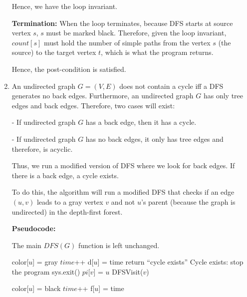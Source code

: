 \documentclass[a4paper]{report}
\begin{document}
\begin{enumerate}
    Hence, we have the loop invariant. 

    {\bf Termination:}
    When the loop terminates, because DFS starts at source vertex $s$, $s$ must be marked black. Therefore, 
    given the loop invariant, $count[s]$ must hold the number of simple paths from the vertex $s$ (the source) to
    the target vertex $t$, which is what the program returns.

    Hence, the post-condition is satisfied.

    \par
    \bigskip

    \item
      An undirected graph $G = (V,E)$ does not contain a cycle iff a DFS generates no back edges. Furthermore, an undirected
      graph $G$ has only tree edges and back edges. Therefore, two cases will exist:

        - If undirected graph $G$ has a back edge, then it has a cycle. 

        - If undirected graph $G$ has no back edges, it only has tree edges and therefore, is acyclic.

      Thus, we run a modified version of DFS where we look for back edges. If there is a back edge, a cycle exists.

      To do this, the algorithm will run a modified DFS that checks if an edge $(u,v)$ leads to a gray vertex $v$ and not 
      $u$'s parent (because the graph is undirected) in the depth-first forest. 

    {\bf Pseudocode:}

    The main $DFS(G)$ function is left unchanged.

    \begin{algorithmic}[1]
      \State color[$u$] = gray
      \State $time$++
      \State d[$u$] = time
          \State return ``cycle exists''
          \Comment Cycle exists: stop the program
          \State sys.exit()
        \EndIf
          \State $pi$[$v$] = $u$
          \State DFSVisit($v$)
        \EndIf
      \EndFor

      \State color[$u$] = black
      \State $time$++
      \State f[$u$] = time
    \EndFunction
    \end{algorithmic}



\end{enumerate}
\end{document}
